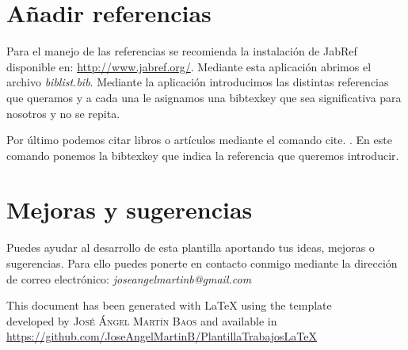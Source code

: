 \documentclass[11pt]{article}
\newif\ifspanish %
\begin{document}
\section{Añadir referencias}
Para el manejo de las referencias se recomienda la instalación de JabRef disponible en: \url{http://www.jabref.org/}. Mediante esta aplicación abrimos el archivo \emph{biblist.bib}. Mediante la aplicación introducimos las distintas referencias que queramos y a cada una le asignamos una bibtexkey que sea significativa para nosotros y no se repita. 

Por último podemos citar libros o artículos mediante el comando cite. \cite{Kottwitz2011} \cite{Martin2017} \cite{Salido2011}. En este comando ponemos la bibtexkey que indica la referencia que queremos introducir.


\section{Mejoras y sugerencias}
Puedes ayudar al desarrollo de esta plantilla aportando tus ideas, mejoras o sugerencias. Para ello puedes ponerte en contacto conmigo mediante la dirección de correo electrónico: \emph{joseangelmartinb@gmail.com}



\newpage



\ifspanish 
	\addcontentsline{toc}{section}{Referencias}
\else
\fi



\null\vfill
\begin{center}
\ifspanish
	Este documento ha sido generado con \LaTeX{} utilizando la plantilla\\
	desarrollada por \textsc{José Ángel Martín Baos} y disponible en\\
	\url{https://github.com/JoseAngelMartinB/PlantillaTrabajosLaTeX}
\else
	This document has been generated with \LaTeX{} using the template\\
	developed by \textsc{José Ángel Martín Baos} and available in\\
	\url{https://github.com/JoseAngelMartinB/PlantillaTrabajosLaTeX}
\fi
\end{center}
\end{document}
